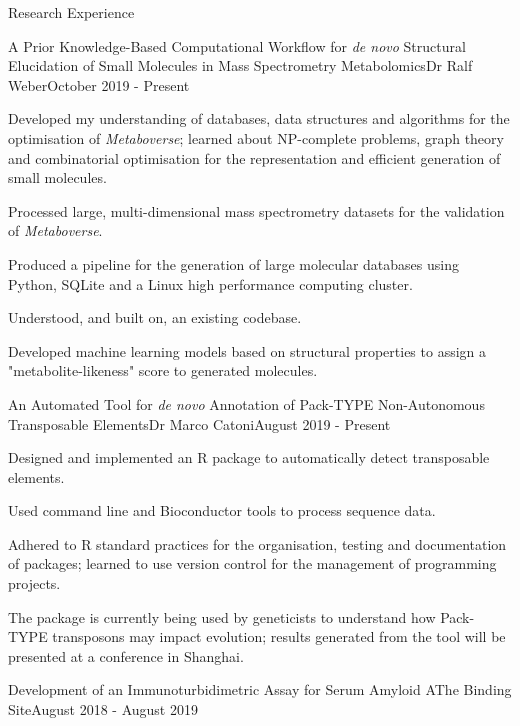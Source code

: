 \documentclass{resume}
\begin{document}
\begin{rSection}{Research Experience}

\begin{rSubsection}{A Prior Knowledge-Based Computational Workflow for \textit{de novo} Structural Elucidation of Small Molecules in Mass Spectrometry Metabolomics}{}{Dr Ralf Weber}{October 2019 - Present}

\item Developed my understanding of databases, data structures and algorithms for the optimisation of \textit{Metaboverse}; learned about NP-complete problems, graph theory and combinatorial optimisation for the representation and efficient generation of small molecules. 
\item Processed large, multi-dimensional mass spectrometry datasets for the validation of \textit{Metaboverse}. 
\item Produced a pipeline for the generation of large molecular databases using Python, SQLite and a Linux high performance computing cluster. 
\item Understood, and built on, an existing codebase. 
\item Developed machine learning models based on structural properties to assign a "metabolite-likeness" score to generated molecules. 
\end{rSubsection}

\begin{rSubsection}{An Automated Tool for \textit{de novo} Annotation of Pack-TYPE Non-Autonomous Transposable Elements}{}{Dr Marco Catoni}{August 2019 - Present}

\item Designed and implemented an R package to automatically detect transposable elements. 
\item Used command line and Bioconductor tools to process sequence data. 
\item Adhered to R standard practices for the organisation, testing and documentation of packages; learned to use version control for the management of programming projects. 
\item The package is currently being used by geneticists to understand how Pack-TYPE transposons may impact evolution; results generated from the tool will be presented at a conference in Shanghai.
\end{rSubsection}

\newpage
\begin{rSubsection}{Development of an Immunoturbidimetric Assay for Serum Amyloid A}{}{The Binding Site}{August 2018 - August 2019}


\end{rSubsection}
\end{rSection}
\end{document}

